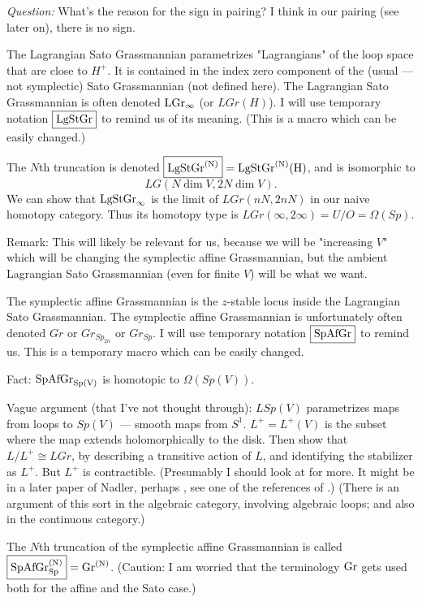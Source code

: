 {{\em Question:} What's the reason for the sign in pairing?  
I think in our pairing (see later on), there is no sign.



The Lagrangian Sato Grassmannian parametrizes "Lagrangians" of the loop space that are close to $H^+$.
It is contained in the index zero component of the (usual --- not symplectic) Sato Grassmannian (not defined here).
The Lagrangian Sato Grassmannian  is often denoted $\rm{LGr}_\infty$ (or $LGr(H)$).  I will use temporary notation $\boxed{\rm{LgStGr}}$ to remind us of its meaning. (This is a macro which can be easily changed.)


The $N$th truncation is denoted $\boxed{\rm{LgStGr}^{(N)}} = \rm{LgStGr}^{(N)}(H)$, and is isomorphic to $$LG(N \dim V, 2N \dim V).$$
We can show that $\rm{LgStGr}_\infty$ is the limit of $LGr(nN, 2nN)$ in our naive homotopy category.   Thus its homotopy type is $LGr(\infty, 2 \infty) = U/O = \Omega(Sp)$.

Remark:
This will likely be relevant for us, because we will be "increasing $V$" which will be changing the symplectic affine Grassmannian, but the ambient Lagrangian Sato Grassmannian (even for finite $V$) will be what we want.  


The symplectic affine Grassmannian is the $z$-stable locus inside the Lagrangian Sato Grassmannian.
The symplectic affine Grassmannian is  unfortunately 
often denoted  $Gr$ or $Gr_{Sp_{2n}}$ or $Gr_{Sp}$. I will use temporary notation $\boxed{\rm{SpAfGr}}$ to remind us.  This is a temporary macro which can be easily changed.

Fact:  $\rm{SpAfGr}_{Sp(V)}$ is homotopic to $\Omega(Sp(V))$.

Vague argument (that I've not thought through):    $L Sp(V)$ parametrizes maps from loops to $Sp(V)$ --- smooth maps from $S^1$.  $\boxed{L^+} =L^+(V)$ is the subset where the map extends holomorphically to the disk.  Then show that $L/L^+ \cong LGr$, by describing a transitive action of $L$, and identifying the stabilizer as $L^+$.  But $L^+$ is contractible.  (Presumably I should look at \cite{ps} for more. It might be in a later paper of  Nadler, perhaps \cite{nadler}, see one of the references of \cite{zhu}.)   (There is an argument of this sort in the algebraic category, involving algebraic loops; and also in the continuous category.)

The $N$th truncation of the symplectic affine Grassmannian is 
called $\boxed{\rm{SpAfGr}_{Sp}^{(N)}} = \rm{Gr}^{(N)}$.  (Caution:  I am worried that the terminology  $\rm{Gr}$  gets used both for the affine and the Sato case.)

}
